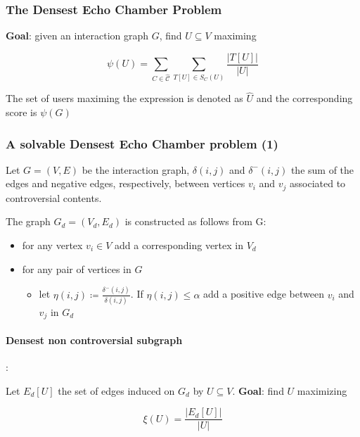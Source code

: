 \documentclass{beamer}
\begin{document}
\begin{frame}[c]
	\frametitle{The Densest Echo Chamber Problem}
	\textbf{Goal}: given an interaction graph $G$, find $U \subseteq V$ maximing

	\begin{equation}
		\psi (U) = \sum^{}_{C \in \hat{\mathcal{C}} } \sum^{}_{T[U] \in S_C (U)}
		\frac{| T[U] |}{|U|}
	\end{equation}

	The set of users maximing the expression is denoted as $\hat{U}$ and the
	corresponding score is $\psi(G)$
\end{frame}

\begin{frame}[c]
	\frametitle{A solvable Densest Echo Chamber problem (1)}

	Let $G = (V, E)$ be the interaction graph, $\delta(i, j)$ and $\delta^{-} (i, j)$ the sum of the
	edges and negative edges, respectively, between vertices $v_{i} $ and
	$v_{j} $ associated to controversial contents.

	\bigskip

	The graph $G_d = (V_{d}, E_{d}) $ is constructed as follows from G:

	\begin{itemize}
		\item for any vertex $v_{i} \in V$ add a corresponding vertex in $V_{d} $
		\item for any pair of vertices in $G $
		      \begin{itemize}
			      \item let $\eta(i,j) \coloneqq \frac{\delta^{-} (i,j)}{\delta
					            (i,j)} $. If $\eta(i,j) \leq \alpha $ add a positive
			            edge between $v_{i} $ and $v_{j} $ in $G_{d} $
		      \end{itemize}
	\end{itemize}

	\paragraph{Densest non controversial subgraph}:%
	\label{par:densest_non_controversial_subgraph}


	Let $E_{d} [U]$ the set of edges induced on $G_d$ by $U \subseteq V$. \textbf{Goal}: find $U$ maximizing

	\begin{equation}
		\xi(U) = \frac{|E_{d} [U]|}{|U|}
	\end{equation}

\end{frame}
\end{document}
